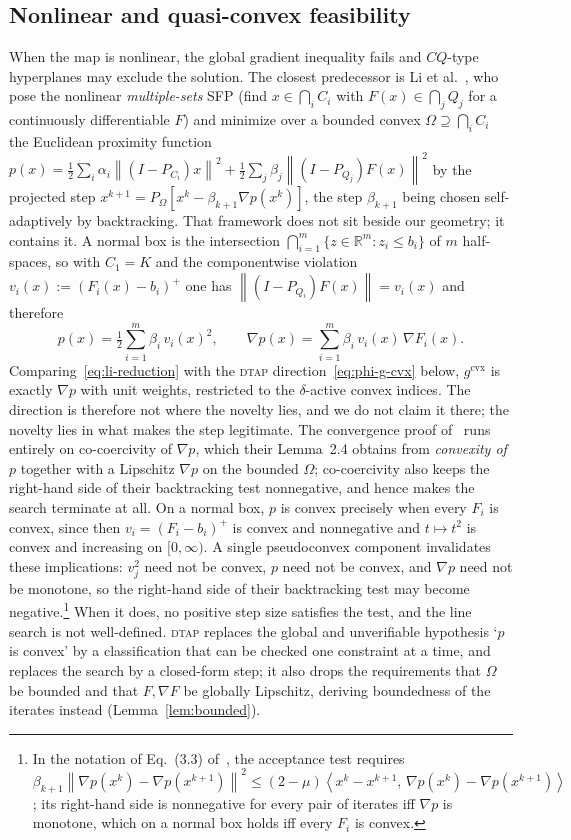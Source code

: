 \documentclass[]{interact}
\theoremstyle{plain}
\theoremstyle{definition}
\theoremstyle{remark}
\newcommand{\R}{\mathbb{R}}
\newcommand{\norm}[1]{\left\lVert #1 \right\rVert}
\newcommand{\inner}[2]{\left\langle #1,\, #2 \right\rangle}
\newcommand{\cvx}{\mathrm{cvx}}
\newcommand{\dtap}{\textsc{dtap}}
\begin{document}
\subsection{Nonlinear and quasi-convex feasibility}\label{ssec:rel-nonlinear}
When the map is nonlinear, the global gradient inequality fails and $CQ$-type hyperplanes may
exclude the solution. The closest predecessor is Li et al.~\citep{li2013nsfp}, who pose the
nonlinear \emph{multiple-sets} SFP (find $x\in\bigcap_i C_i$ with $F(x)\in\bigcap_j Q_j$ for a
continuously differentiable $F$) and minimize over a bounded convex $\Omega\supseteq\bigcap_iC_i$
the Euclidean proximity function
$p(x)=\tfrac12\sum_i\alpha_i\norm{(I-P_{C_i})x}^2+\tfrac12\sum_j\beta_j\norm{(I-P_{Q_j})F(x)}^2$
by the projected step $x^{k+1}=P_\Omega[x^k-\beta_{k+1}\nabla p(x^k)]$, the step $\beta_{k+1}$
being chosen self-adaptively by backtracking. That framework does not sit beside our geometry; it
contains it. A normal box is the intersection $\bigcap_{i=1}^m\{z\in\R^m:z_i\le b_i\}$ of $m$
half-spaces, so with $C_1=K$ and the componentwise violation $v_i(x):=(F_i(x)-b_i)^+$ one has
$\norm{(I-P_{Q_i})F(x)}=v_i(x)$ and therefore
\begin{equation}\label{eq:li-reduction}
p(x)=\tfrac12\sum_{i=1}^m\beta_i\,v_i(x)^2,\qquad
\nabla p(x)=\sum_{i=1}^m\beta_i\,v_i(x)\,\nabla F_i(x).
\end{equation}
Comparing~\eqref{eq:li-reduction} with the \dtap{} direction~\eqref{eq:phi-g-cvx} below,
$g^{\cvx}$ is exactly $\nabla p$ with unit weights, restricted to the $\delta$-active convex
indices. The direction is therefore not where the novelty lies, and we do not claim it there; the novelty lies in what makes the step legitimate. The convergence proof of~\citep{li2013nsfp} runs entirely on
co-coercivity of $\nabla p$, which their Lemma~2.4 obtains from \emph{convexity of $p$} together
with a Lipschitz $\nabla p$ on the bounded $\Omega$; co-coercivity also keeps the
right-hand side of their backtracking test nonnegative, and hence makes the search terminate at
all. On a normal box, $p$ is convex precisely when every $F_i$ is convex, since then
$v_i=(F_i-b_i)^+$ is convex and nonnegative and $t\mapsto t^2$ is convex and increasing on
$[0,\infty)$. A single pseudoconvex component invalidates these implications: $v_j^2$ need not be convex, $p$ need not be convex, and $\nabla p$ need not be monotone, so the right-hand side of their backtracking test may become negative.\footnote{In the notation of Eq.~(3.3) of~\citep{li2013nsfp}, the acceptance test requires $\beta_{k+1}\norm{\nabla p(x^k)-\nabla p(x^{k+1})}^2\le(2-\mu)\inner{x^k-x^{k+1}}{\nabla p(x^k)-\nabla p(x^{k+1})}$; its right-hand side is nonnegative for every pair of iterates iff $\nabla p$ is monotone, which on a normal box holds iff every $F_i$ is convex.} When it does, no positive step size satisfies the test, and the line search is not well-defined. \dtap{} replaces the global and unverifiable
hypothesis `$p$ is convex' by a classification that can be checked one constraint at a time, and
replaces the search by a closed-form step; it also drops the requirements that $\Omega$ be bounded
and that $F,\nabla F$ be globally Lipschitz, deriving boundedness of the iterates instead
(Lemma~\ref{lem:bounded}).
\end{document}
